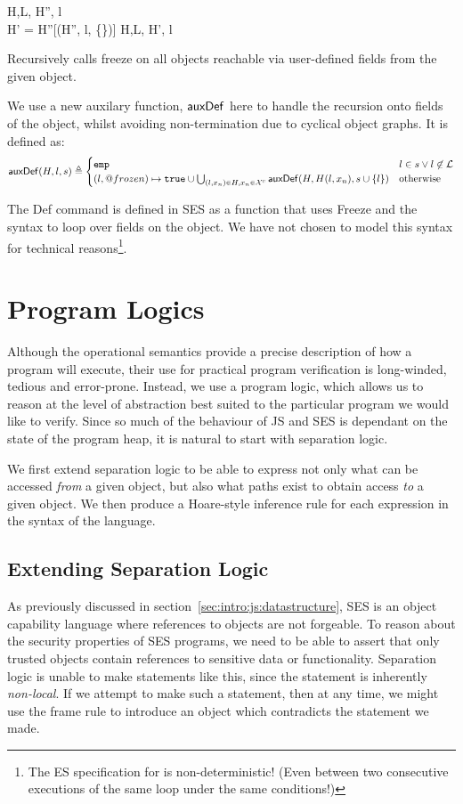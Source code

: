 \documentclass[a4paper,notitlepage]{report}
\begin{document}
  {H,L, \gevalsto H'', l \\
   H' = H''[\auxDef(H'', l, \{\})]}
  {H,L, \evalsto H', l}

Recursively calls freeze on all objects reachable
via user-defined fields from the given object.

We use a new auxilary function, $\mathsf{auxDef}$ here to handle the recursion onto
fields of the object, whilst avoiding non-termination due to cyclical object
graphs. It is defined as:
\[
  \mathsf{auxDef}(H,l,s) \triangleq \begin{cases}
    \texttt{emp} & l \in s \lor l \not\in \mathcal{L} \\
    (l,@frozen) \mapsto \texttt{true} \cup \bigcup_{(l,x_n) \in H, x_n \in \mathcal{X}^{\textsc{u}}}
      \mathsf{auxDef}(H,H(l,x_n),s \cup\{l\}) & \mbox{otherwise} \\
  \end{cases}
\]

The Def command is defined in SES as a function that uses Freeze and the
 syntax to loop over fields on the object. We have not chosen to
model this syntax for technical reasons\footnote{The ES specification for
 is non-deterministic! (Even between two consecutive executions of
the same loop under the same conditions!)}.

\chapter{Program Logics}
\label{chap:proglogic}
Although the operational semantics provide a precise description of how a
program will execute, their use for practical program verification is
long-winded, tedious and error-prone. Instead, we use a program logic, which
allows us to reason at the level of abstraction best suited to the particular
program we would like to verify. Since so much of the behaviour of JS and SES is
dependant on the state of the program heap, it is natural to start with
separation logic.

We first extend separation logic to be able to express not only what can be
accessed \emph{from} a given object, but also what paths exist to obtain access
\emph{to} a given object. We then produce a Hoare-style inference rule for each
expression in the syntax of the language.

\section{Extending Separation Logic}
\label{sec:extendingseplog}
As previously discussed in section~\ref{sec:intro:js:datastructure}, SES is an
object capability language where references to objects are not forgeable.
To reason about the security properties of SES programs, we need to be able to
assert that only trusted objects contain references to sensitive data or
functionality. 
Separation logic is unable to make statements like this, since the
statement is inherently \emph{non-local}. If we attempt to make such a
statement, then at any time, we might use the frame rule to introduce an object
which contradicts the statement we made.
\end{document}
